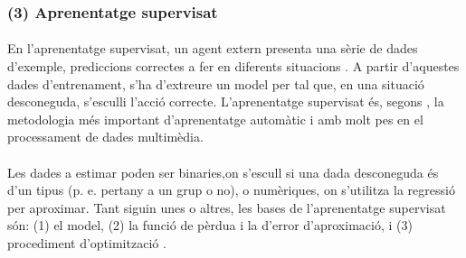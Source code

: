 \documentclass[12pt,a4paper,final,twoside]{article}
\begin{document}

\subsubsection*{(3) Aprenentatge supervisat}

\paragraph{}En l'aprenentatge supervisat, un agent extern presenta una sèrie de dades d'exemple, prediccions correctes a fer en diferents situacions \cite{Kober2009}. A partir d'aquestes dades d'entrenament, s'ha d'extreure un model per tal que, en una situació desconeguda, s'esculli l'acció correcte. L'aprenentatge supervisat és, segons \cite{Cord2008}, la metodologia més important d'aprenentatge automàtic i amb molt pes en el processament de dades multimèdia.

\paragraph{}Les dades a estimar poden ser binaries,on s'escull si una dada desconeguda és d'un tipus (p. e. pertany a un grup o no), o numèriques, on s'utilitza la regressió per aproximar. Tant siguin unes o altres, les bases de l'aprenentatge supervisat són: (1) el model, (2) la funció de pèrdua i la d'error d'aproximació, i (3) procediment d'optimització \cite{Alpaydin2004}.
\end{document}
